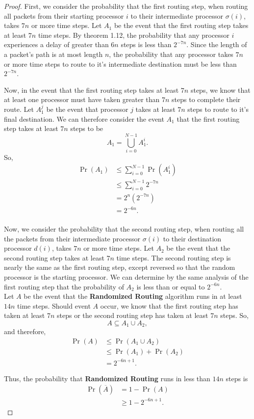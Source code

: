 \documentclass[psamsfonts, 10pt]{amsart}
\theoremstyle{definition}
\theoremstyle{remark}
\numberwithin{equation}{section}
\newcommand{\creturn}{\mbox{}\\}
\begin{document}
\begin{proof}
First, we consider the probability that the first routing step, when routing all packets from their starting processor $i$ to their intermediate processor $\sigma(i)$, takes $7n$ or more time steps. Let $A_1$ be the event that the first routing step takes at least $7n$ time steps. By theorem 1.12, the probability that any processor $i$ experiences a delay of greater than $6n$ steps is less than $2^{-7n}$. Since the length of a packet's path is at most length $n$, the probability that any processor takes $7n$ or more time steps to route to it's intermediate destination must be less than $2^{-7n}$.

Now, in the event that the first routing step takes at least $7n$ steps, we know that at least one processor must have taken greater than $7n$ steps to complete their route. Let $A_1^j$ be the event that processor $j$ takes at least $7n$ steps to route to it's final destination. We can therefore consider the event $A_1$ that the first routing step takes at least $7n$ steps to be
\[
A_1 = \bigcup_{i = 0}^{N-1} A_1^i.
\]
So,
\[
\begin{aligned}
\Pr(A_1) &\leq \sum_{i = 0}^{N-1}\Pr(A_1^i)\\
&\leq \sum_{i=0}^{N-1}2^{-7n}\\
&= 2^n(2^{-7n})\\
&= 2^{-6n}.
\end{aligned}
\]
\creturn

Now, we consider the probability that the second routing step, when routing all the packets from their intermediate processor $\sigma(i)$ to their destination processor $d(i)$, takes $7n$ or more time steps. Let $A_2$ be the event that the second routing step takes at least $7n$ time steps. The second routing step is nearly the same as the first routing step, except reversed so that the random processor is the starting processor. We can determine by the same analysis of the first routing step that the probability of $A_2$ is less than or equal to $2^{-6n}$.\\

Let $A$ be the event that the {\bf Randomized Routing} algorithm runs in at least $14n$ time steps. Should event $A$ occur, we know that the first routing step has taken at least $7n$ steps or the second routing step has taken at least $7n$ steps. So, 
\[
A \subseteq A_1 \cup A_2,
\]
and therefore, 
\[
\begin{aligned}
\Pr(A) &\leq \Pr(A_1 \cup A_2)\\
&\leq \Pr(A_1) + \Pr(A_2)\\
&= 2^{-6n+1}.
\end{aligned}
\]

Thus, the probability that  {\bf Randomized Routing} runs in less than $14n$ steps is 
\[
\begin{aligned}
\Pr(\overline{A}) &= 1- \Pr(A)\\
&\geq 1 - 2^{-6n + 1}.
\end{aligned}
\]
\end{proof}
\end{document}
